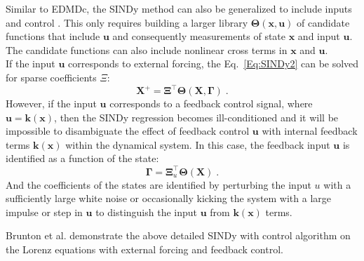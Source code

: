 Similar to EDMDc, the SINDy method can also be generalized to include inputs and control \cite{SINDyc}. This only requires building a larger library $\mathbf{\Theta(x,u)}$ of candidate functions that include $\mathbf{u}$ and consequently measurements of state $\mathbf{x}$ and input $\mathbf{u}$. The candidate functions can also include nonlinear cross terms in $\mathbf{x}$ and $\mathbf{u}$.\\
If the input $\mathbf{u}$ corresponds to external forcing, the Eq.~\ref{Eq:SINDy2} can be solved for sparse coefficients $\Xi$: 
\begin{equation}
            \mathbf{X^+} = \mathbf{\Xi^\top \Theta(X,\Gamma)} \;.
\end{equation}
However, if the input $\mathbf{u}$ corresponds to a feedback control signal, where $\mathbf{u = k(x)}$, then the SINDy regression becomes ill-conditioned and it will be impossible to disambiguate the effect of feedback control $\mathbf{u}$ with internal feedback terms $\mathbf{k(x)}$ within the dynamical system. In this case, the feedback input $\mathbf{u}$ is identified as a function of the state:
\begin{equation}
    \mathbf{\Gamma} = \mathbf{\Xi}_u^\top \mathbf{\Theta(X)}\;.
\end{equation}
And the coefficients of the states are identified by perturbing the input $u$ with a sufficiently large white noise or occasionally kicking the system with a large impulse or step in $\mathbf{u}$ to distinguish the input $\mathbf{u}$ from $\mathbf{k(x)}$ terms.
\par 
Brunton et al. \cite{SINDyc} demonstrate the above detailed SINDy with control algorithm on the Lorenz equations with external forcing and feedback control.
\newpage

